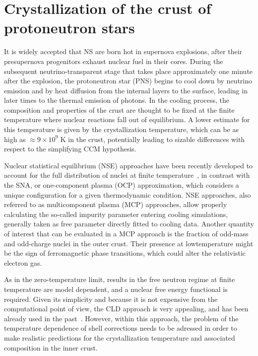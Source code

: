 \chapter{Crystallization of the crust of protoneutron stars}

It is widely accepted that NS are born hot in supernova 
explosions, after their presupernova progenitors exhaust nuclear fuel in their
cores. During the subsequent neutrino-transparent stage that takes place 
approximately one minute after the explosion, the protoneutron star (PNS) 
begins to cool down by neutrino emission and by heat diffusion from the 
internal layers to the surface, leading in later times to the thermal emission 
of photons.
In the cooling process, the composition and properties of the crust are thought 
to be fixed at the finite temperature where nuclear reactions fall out of 
equilibrium. A lower estimate for this temperature is given by the 
crystallization temperature, which can be as high as $\approx 9\times 10^9$ K
in the crust, potentially leading to sizable differences with respect to
the simplifying CCM hypothesis.

Nuclear statistical equilibrium (NSE) approaches have been recently developed 
to account for the full distribution of nuclei at finite 
temperature~\cite{Gulminelli2015}, in contrast with the SNA, or one-component
plasma (OCP) approximation, which considers a unique 
configuration for a given thermodynamic condition. NSE approaches, also 
referred to as multicomponent plasma (MCP) approaches, allow properly 
calculating the so-called impurity parameter entering cooling simulations, 
generally taken as free parameter directly fitted to cooling data. 
Another quantity of interest that can be evaluated in a MCP approach is the 
fraction of odd-mass and odd-charge nuclei in the outer crust. Their presence 
at lowtemperature might be the sign of ferromagnetic phase transitions, which 
could alter the relativistic electron gas.

As in the zero-temperature limit, results in the free neutron regime at
finite temperature are model dependent, and a nuclear free energy
functional is required. Given its simplicity and because it is not expensive
from the computational point of view, the CLD approach is very appealing, and 
has been already used in the past~\cite{Gulminelli2015,Grams2018}. However,
within this approach, the problem of the temperature dependence of shell 
corrections needs to be adressed in order to make realistic predictions for the 
crystallization temperature and associated composition in the inner crust.


